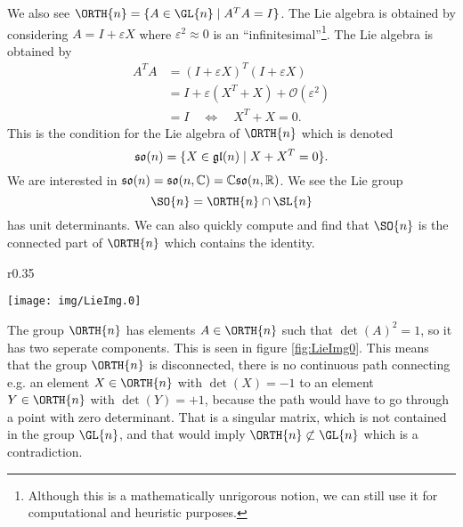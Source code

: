 We also see $\ORTH{n}=\{A\in\GL{n}\mid A^{T}A=I\}$. The Lie algebra
is obtained by considering $A=I+\varepsilon X$ where
$\varepsilon^{2}\approx 0$ is an
``infinitesimal''\footnote{Although this is a mathematically
  unrigorous notion, we can still use it for computational and
  heuristic purposes.}. The Lie algebra is obtained by
\begin{subequations}
\begin{align}
A^{T}A &= (I+\varepsilon X)^{T}(I+\varepsilon X)\\
&= I +\varepsilon(X^{T}+X)+\mathcal{O}(\varepsilon^2)\\
&= I\quad\iff\quad X^{T}+X=0.
\end{align}
\end{subequations}
This is the condition for the Lie algebra of $\ORTH{n}$ which is denoted
\begin{equation}
\frak{so}(n)=\{X\in\frak{gl}(n)\mid X+X^{T}=0\}.
\end{equation}
We are interested in
$\frak{so}(n)=\frak{so}(n,\Bbb{C})=\Bbb{C}\frak{so}(n,\Bbb{R})$. We
see the Lie group
\begin{equation}
\SO{n}=\ORTH{n}\cap\SL{n}
\end{equation}
has unit determinants. We can also quickly compute and find that
$\SO{n}$ is the connected part of $\ORTH{n}$ which contains the identity.

\begin{wrapfigure}[12]{r}{0.35\textwidth}
  \vspace{-30pt}
  \begin{center}
    \texttt{[image: img/LieImg.0]}
  \end{center}
  \vspace{-20pt}
  \caption{{\small The Two Seperated Components of O$(n)$.}}\label{fig:LieImg0}
  \vspace{20pt}
\end{wrapfigure}

The group $\ORTH{n}$ has elements $A\in\ORTH{n}$ such that
$\det(A)^{2}=1$, so it has two seperate components. This is seen
in figure \ref{fig:LieImg0}. This means that the group $\ORTH{n}$ is
disconnected, there is no continuous path connecting e.g. an
element $X\in\ORTH{n}$ with $\det(X)=-1$ to an element $Y\in\ORTH{n}$
with $\det(Y)=+1$, because the path would have to go through a
point with zero determinant. That is a singular matrix, which is
not contained in the group $\GL{n}$, and that would imply
$\ORTH{n}\not\subset\GL{n}$ which is a contradiction.

